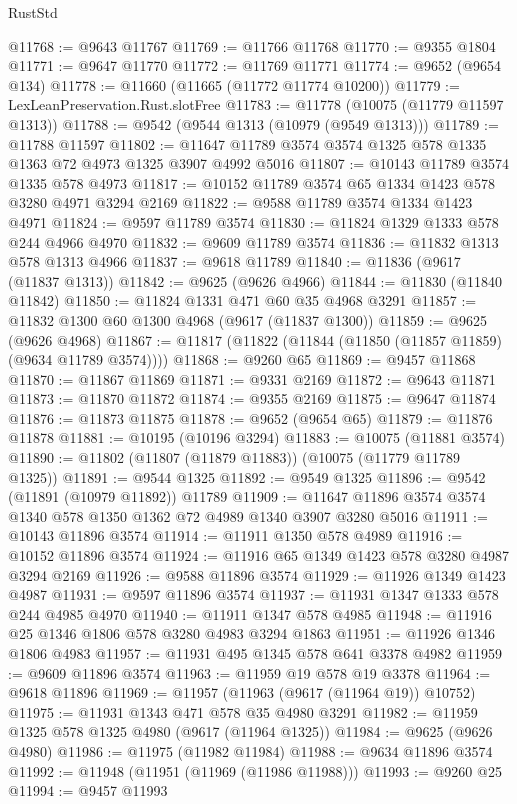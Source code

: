 \begin{lexlean}{RustStd}
\begin{coremodule}
@11768 := @9643 @11767
@11769 := @11766 @11768
@11770 := @9355 @1804
@11771 := @9647 @11770
@11772 := @11769 @11771
@11774 := @9652 (@9654 @134)
@11778 := @11660 (@11665 (@11772 @11774 @10200))
@11779 := LexLeanPreservation.Rust.slotFree
@11783 := @11778 (@10075 (@11779 @11597 @1313))
@11788 := @9542 (@9544 @1313 (@10979 (@9549 @1313)))
@11789 := @11788 @11597
@11802 := @11647 @11789 @3574 @3574 @1325 @578 @1335 @1363 @72 @4973 @1325 @3907 @4992 @5016
@11807 := @10143 @11789 @3574 @1335 @578 @4973
@11817 := @10152 @11789 @3574 @65 @1334 @1423 @578 @3280 @4971 @3294 @2169
@11822 := @9588 @11789 @3574 @1334 @1423 @4971
@11824 := @9597 @11789 @3574
@11830 := @11824 @1329 @1333 @578 @244 @4966 @4970
@11832 := @9609 @11789 @3574
@11836 := @11832 @1313 @578 @1313 @4966
@11837 := @9618 @11789
@11840 := @11836 (@9617 (@11837 @1313))
@11842 := @9625 (@9626 @4966)
@11844 := @11830 (@11840 @11842)
@11850 := @11824 @1331 @471 @60 @35 @4968 @3291
@11857 := @11832 @1300 @60 @1300 @4968 (@9617 (@11837 @1300))
@11859 := @9625 (@9626 @4968)
@11867 := @11817 (@11822 (@11844 (@11850 (@11857 @11859) (@9634 @11789 @3574))))
@11868 := @9260 @65
@11869 := @9457 @11868
@11870 := @11867 @11869
@11871 := @9331 @2169
@11872 := @9643 @11871
@11873 := @11870 @11872
@11874 := @9355 @2169
@11875 := @9647 @11874
@11876 := @11873 @11875
@11878 := @9652 (@9654 @65)
@11879 := @11876 @11878
@11881 := @10195 (@10196 @3294)
@11883 := @10075 (@11881 @3574)
@11890 := @11802 (@11807 (@11879 @11883)) (@10075 (@11779 @11789 @1325))
@11891 := @9544 @1325
@11892 := @9549 @1325
@11896 := @9542 (@11891 (@10979 @11892)) @11789
@11909 := @11647 @11896 @3574 @3574 @1340 @578 @1350 @1362 @72 @4989 @1340 @3907 @3280 @5016
@11911 := @10143 @11896 @3574
@11914 := @11911 @1350 @578 @4989
@11916 := @10152 @11896 @3574
@11924 := @11916 @65 @1349 @1423 @578 @3280 @4987 @3294 @2169
@11926 := @9588 @11896 @3574
@11929 := @11926 @1349 @1423 @4987
@11931 := @9597 @11896 @3574
@11937 := @11931 @1347 @1333 @578 @244 @4985 @4970
@11940 := @11911 @1347 @578 @4985
@11948 := @11916 @25 @1346 @1806 @578 @3280 @4983 @3294 @1863
@11951 := @11926 @1346 @1806 @4983
@11957 := @11931 @495 @1345 @578 @641 @3378 @4982
@11959 := @9609 @11896 @3574
@11963 := @11959 @19 @578 @19 @3378
@11964 := @9618 @11896
@11969 := @11957 (@11963 (@9617 (@11964 @19)) @10752)
@11975 := @11931 @1343 @471 @578 @35 @4980 @3291
@11982 := @11959 @1325 @578 @1325 @4980 (@9617 (@11964 @1325))
@11984 := @9625 (@9626 @4980)
@11986 := @11975 (@11982 @11984)
@11988 := @9634 @11896 @3574
@11992 := @11948 (@11951 (@11969 (@11986 @11988)))
@11993 := @9260 @25
@11994 := @9457 @11993

\end{coremodule}
\end{lexlean}
